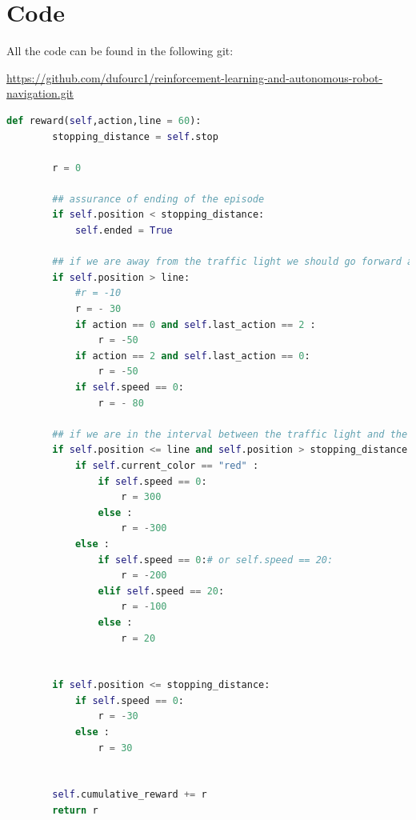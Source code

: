 \documentclass[14pt,a4paper]{article}
\theoremstyle{definition}
\begin{document}
\section{Code} \label{code}

All the code can be found in the following git: 

 \url{https://github.com/dufourc1/reinforcement-learning-and-autonomous-robot-navigation.git}

\lstlistoflistings
\vspace{1cm}


\begin{lstlisting}[language=Python, caption=Reward Function used in this project]
    def reward(self,action,line = 60):
        stopping_distance = self.stop

        r = 0

        ## assurance of ending of the episode
        if self.position < stopping_distance:
            self.ended = True

        ## if we are away from the traffic light we should go forward and no stop
        if self.position > line:
            #r = -10
            r = - 30
            if action == 0 and self.last_action == 2 :
                r = -50
            if action == 2 and self.last_action == 0:
                r = -50
            if self.speed == 0:
                r = - 80

        ## if we are in the interval between the traffic light and the line we should respect the traffic light
        if self.position <= line and self.position > stopping_distance:
            if self.current_color == "red" :
                if self.speed == 0:
                    r = 300
                else :
                    r = -300
            else :
                if self.speed == 0:# or self.speed == 20:
                    r = -200
                elif self.speed == 20:
                    r = -100
                else :
                    r = 20


        if self.position <= stopping_distance:
            if self.speed == 0:
                r = -30
            else :
                r = 30


        self.cumulative_reward += r
        return r
\end{lstlisting}










\nocite{Watkins_phd}
\newpage
{}




\end{document}

